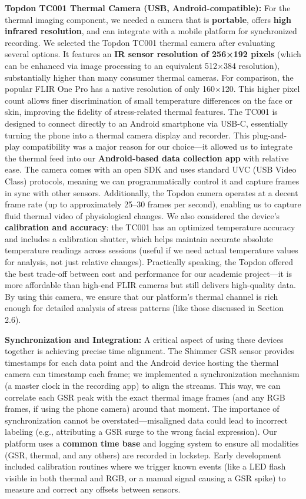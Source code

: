 \textbf{Topdon TC001 Thermal Camera (USB, Android-compatible):} For the thermal imaging component, we needed a camera that is \textbf{portable}, offers \textbf{high infrared resolution}, and can integrate with a mobile platform for synchronized recording. We selected the Topdon TC001 thermal camera after evaluating several options. It features an \textbf{IR sensor resolution of 256×192 pixels} (which can be enhanced via image processing to an equivalent 512×384 resolution)\cite{TopdonTC001}, substantially higher than many consumer thermal cameras. For comparison, the popular FLIR One Pro has a native resolution of only 160×120. This higher pixel count allows finer discrimination of small temperature differences on the face or skin, improving the fidelity of stress-related thermal features. The TC001 is designed to connect directly to an Android smartphone via USB-C, essentially turning the phone into a thermal camera display and recorder. This plug-and-play compatibility was a major reason for our choice—it allowed us to integrate the thermal feed into our \textbf{Android-based data collection app} with relative ease. The camera comes with an open SDK and uses standard UVC (USB Video Class) protocols, meaning we can programmatically control it and capture frames in sync with other sensors. Additionally, the Topdon camera operates at a decent frame rate (up to approximately 25–30 frames per second), enabling us to capture fluid thermal video of physiological changes. We also considered the device's \textbf{calibration and accuracy}: the TC001 has an optimized temperature accuracy and includes a calibration shutter, which helps maintain accurate absolute temperature readings across sessions (useful if we need actual temperature values for analysis, not just relative changes). Practically speaking, the Topdon offered the best trade-off between cost and performance for our academic project—it is more affordable than high-end FLIR cameras but still delivers high-quality data. By using this camera, we ensure that our platform's thermal channel is rich enough for detailed analysis of stress patterns (like those discussed in Section 2.6).

\textbf{Synchronization and Integration:} A critical aspect of using these devices together is achieving precise time alignment. The Shimmer GSR sensor provides timestamps for each data point and the Android device hosting the thermal camera can timestamp each frame; we implemented a synchronization mechanism (a master clock in the recording app) to align the streams. This way, we can correlate each GSR peak with the exact thermal image frames (and any RGB frames, if using the phone camera) around that moment. The importance of synchronization cannot be overstated—misaligned data could lead to incorrect labeling (e.g., attributing a GSR surge to the wrong facial expression). Our platform uses a \textbf{common time base} and logging system to ensure all modalities (GSR, thermal, and any others) are recorded in lockstep. Early development included calibration routines where we trigger known events (like a LED flash visible in both thermal and RGB, or a manual signal causing a GSR spike) to measure and correct any offsets between sensors.

